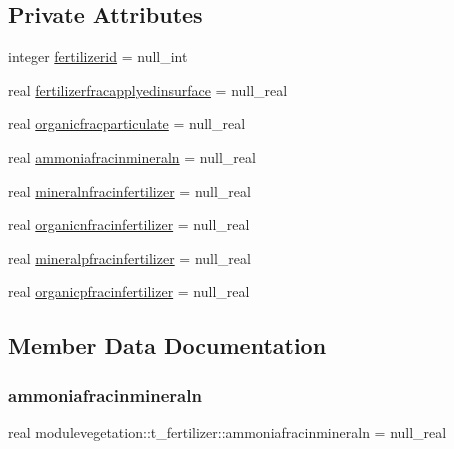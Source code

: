 \subsection*{Private Attributes}
\begin{DoxyCompactItemize}
\item 
integer \mbox{\hyperlink{structmodulevegetation_1_1t__fertilizer_a4bbd0d118460c7f9844905767384decb}{fertilizerid}} = null\+\_\+int
\item 
real \mbox{\hyperlink{structmodulevegetation_1_1t__fertilizer_a5c409a7c069ecb61260bd18253fb8145}{fertilizerfracapplyedinsurface}} = null\+\_\+real
\item 
real \mbox{\hyperlink{structmodulevegetation_1_1t__fertilizer_aa39b79b4a55d0592541c648481a8a180}{organicfracparticulate}} = null\+\_\+real
\item 
real \mbox{\hyperlink{structmodulevegetation_1_1t__fertilizer_a4d98d096a23cf865e8a68964c30a3d98}{ammoniafracinmineraln}} = null\+\_\+real
\item 
real \mbox{\hyperlink{structmodulevegetation_1_1t__fertilizer_a293c34598be4229d29286e90e572ecb6}{mineralnfracinfertilizer}} = null\+\_\+real
\item 
real \mbox{\hyperlink{structmodulevegetation_1_1t__fertilizer_adbedd452a44c5bd0bc79b6bc8fd4010e}{organicnfracinfertilizer}} = null\+\_\+real
\item 
real \mbox{\hyperlink{structmodulevegetation_1_1t__fertilizer_af099083ca8513e4e9c15cc60a0425594}{mineralpfracinfertilizer}} = null\+\_\+real
\item 
real \mbox{\hyperlink{structmodulevegetation_1_1t__fertilizer_a1657ef981bde74855e9bab7ec3fba63c}{organicpfracinfertilizer}} = null\+\_\+real
\end{DoxyCompactItemize}


\subsection{Member Data Documentation}
\mbox{\label{structmodulevegetation_1_1t__fertilizer_a4d98d096a23cf865e8a68964c30a3d98}} 
\subsubsection{\texorpdfstring{ammoniafracinmineraln}{ammoniafracinmineraln}}
{\footnotesize\ttfamily real modulevegetation\+::t\+\_\+fertilizer\+::ammoniafracinmineraln = null\+\_\+real\hspace{0.3cm}{\ttfamily [private]}}

